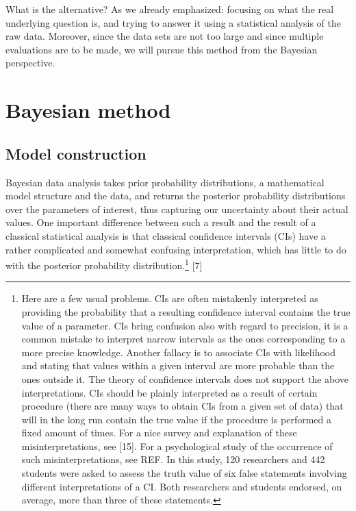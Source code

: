 \documentclass[
  12pt,
  dvipsnames,enabledeprecatedfontcommands]{scrartcl}
\begin{document}
What is the alternative? As we already emphasized: focusing on what the
real underlying question is, and trying to answer it using a statistical
analysis of the raw data. Moreover, since the data sets are not too
large and since multiple evaluations are to be made, we will pursue this
method from the Bayesian perspective.

\hypertarget{bayesian-method}{%
\section{Bayesian method}\label{bayesian-method}}

\label{sec:bayesian}

\hypertarget{model-construction}{%
\subsection{Model construction}\label{model-construction}}

\label{subsec:model}

Bayesian data analysis takes prior probability distributions, a
mathematical model structure and the data, and returns the posterior
probability distributions over the parameters of interest, thus
capturing our uncertainty about their actual values. One important
difference between such a result and the result of a classical
statistical analysis is that classical confidence intervals (CIs) have a
rather complicated and somewhat confusing interpretation, which has
little to do with the posterior probability distribution.\footnote{Here
  are a few usual problems. CIs are often mistakenly interpreted as
  providing the probability that a resulting confidence interval
  contains the true value of a parameter. CIs bring confusion also with
  regard to precision, it is a common mistake to interpret narrow
  intervals as the ones corresponding to a more precise knowledge.
  Another fallacy is to associate CIs with likelihood and stating that
  values within a given interval are more probable than the ones outside
  it. The theory of confidence intervals does not support the above
  interpretations. CIs should be plainly interpreted as a result of
  certain procedure (there are many ways to obtain CIs from a given set
  of data) that will in the long run contain the true value if the
  procedure is performed a fixed amount of times. For a nice survey and
  explanation of these misinterpretations, see {[}15{]}. For a
  psychological study of the occurrence of such misinterpretations, see
  REF. In this study, 120 researchers and 442 students were asked to
  assess the truth value of six false statements involving different
  interpretations of a CI. Both researchers and students endorsed, on
  average, more than three of these statements.} {[}7{]}
\end{document}
